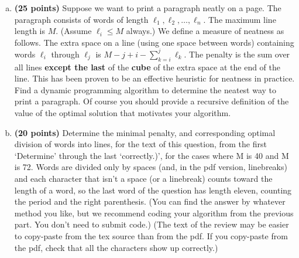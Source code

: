 \documentclass[11pt,letterpaper]{article}
\begin{document}
\pagebreak
\begin{problem}\noindent
    \begin{enumerate}[(a)]
        \item {\bf (25 points)} Suppose we want to print a paragraph neatly on a page. The paragraph consists of words of length $\ell_1,\ell_2,\ldots,\ell_n$.  The maximum line length is $M$. (Assume $\ell_i \leq M$ always.) We define a measure of neatness as follows. The extra space on a line (using one space between words) containing words $\ell_i$ through $\ell_j$ is $M-j+i-\sum_{k=i}^j \ell_k$. The penalty is the sum over all lines {\bf except the last} of the {\bf cube} of the extra space at the end of the line. This has been proven to be an effective heuristic for neatness in practice. Find a dynamic programming algorithm to determine the neatest way to print a paragraph. Of course you should provide a recursive definition of the value of the optimal solution that motivates your algorithm.
        \item {\bf (20 points)} Determine the minimal penalty, and corresponding optimal division of words into lines, for the text of this question, from the first `Determine' through the last `correctly.)', for the cases where M is 40 and M is 72. Words are divided only by spaces (and, in the pdf version, linebreaks) and each character that isn't a space (or a linebreak) counts toward the length of a word, so the last word of the question has length eleven, counting the period and the right parenthesis. (You can find the answer by whatever method you like, but we recommend coding your algorithm from the previous part. You don't need to submit code.) (The text of the review may be easier to copy-paste from the tex source than from the pdf. If you copy-paste from the pdf, check that all the characters show up correctly.)
    \end{enumerate}
\end{problem}
\end{document}
